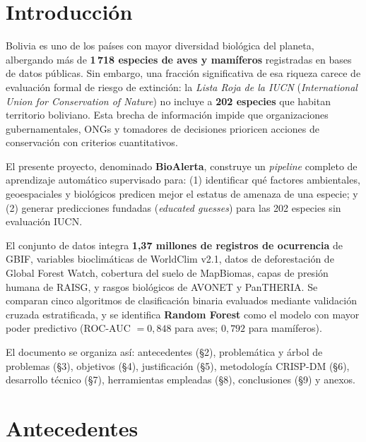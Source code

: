 \documentclass[12pt,a4paper]{article}
\begin{document}
\section{Introducción}

Bolivia es uno de los países con mayor diversidad biológica del planeta, albergando más de
\textbf{1\,718 especies de aves y mamíferos} registradas en bases de datos públicas.
Sin embargo, una fracción significativa de esa riqueza carece de evaluación formal de riesgo de extinción:
la \textit{Lista Roja de la IUCN} (\textit{International Union for Conservation of Nature})
no incluye a \textbf{202 especies} que habitan territorio boliviano.
Esta brecha de información impide que organizaciones gubernamentales, ONGs y tomadores de decisiones
prioricen acciones de conservación con criterios cuantitativos.

El presente proyecto, denominado \textbf{BioAlerta}, construye un \textit{pipeline} completo de
aprendizaje automático supervisado para: (1) identificar qué factores ambientales, geoespaciales y
biológicos predicen mejor el estatus de amenaza de una especie; y (2) generar predicciones fundadas
(\textit{educated guesses}) para las 202 especies sin evaluación IUCN.

El conjunto de datos integra \textbf{1,37 millones de registros de ocurrencia} de GBIF,
variables bioclimáticas de WorldClim v2.1, datos de deforestación de Global Forest Watch,
cobertura del suelo de MapBiomas, capas de presión humana de RAISG, y rasgos biológicos
de AVONET y PanTHERIA.
Se comparan cinco algoritmos de clasificación binaria evaluados mediante validación cruzada
estratificada, y se identifica \textbf{Random Forest} como el modelo con mayor poder predictivo
(ROC-AUC $= 0{,}848$ para aves; $0{,}792$ para mamíferos).

El documento se organiza así: antecedentes (\S 2), problemática y árbol de problemas (\S 3),
objetivos (\S 4), justificación (\S 5), metodología CRISP-DM (\S 6), desarrollo técnico (\S 7),
herramientas empleadas (\S 8), conclusiones (\S 9) y anexos.

\section{Antecedentes}
\end{document}
